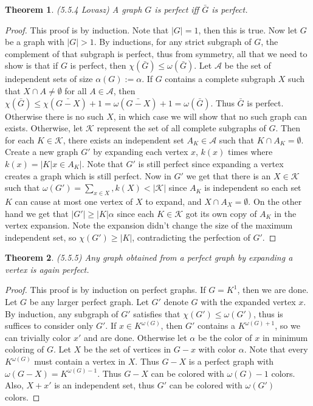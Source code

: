 \documentclass[12pt]{article}
\newtheorem{theorem}{Theorem}
\begin{document}
\begin{theorem} (5.5.4 Lovasz) A graph $G$ is perfect iff $\bar{G}$ is
  perfect.
\end{theorem}
\begin{proof} This proof is by induction. Note that $|G| = 1$, then
  this is true. Now let $G$ be a graph with $|G| > 1$. By inductions,
  for any strict subgraph of $G$, the complement of that subgraph is
  perfect, thus from symmetry, all that we need to show is that if $G$
  is perfect, then $\chi(\bar{G}) \leq \omega(\bar{G})$. Let
  $\mathcal{A}$ be the set of independent sets of size
  $\alpha(G) := \alpha$. If $G$ contains a complete subgraph $X$ such
  that $X \cap A \neq \emptyset$ for all $A \in \mathcal{A}$, then
  $\chi(\bar{G}) \leq \chi(\bar{G - X}) + 1 = \omega(\bar{G - X}) + 1
  = \omega(\bar{G})$. Thus $\bar{G}$ is perfect. Otherwise there is no
  such $X$, in which case we will show that no such graph can
  exists. Otherwise, let $\mathcal{K}$ represent the set of all
  complete subgraphs of $G$. Then for each $K \in \mathcal{K}$, there
  exists an independent set $A_K \in \mathcal{A}$ such that
  $K \cap A_K = \emptyset$. Create a new graph $G'$ by expanding each
  vertex $x$, $k(x)$ times where $k(x) = |{K | x \in A_K}|$. Note that
  $G'$ is still perfect since expanding a vertex creates a graph which
  is still perfect. Now in $G'$ we get that there is an
  $X \in \mathcal{K}$ such that
  $\omega(G') = \sum_{x \in X}, k(X) < |\mathcal{K}|$ since $A_K$ is
  independent so each set $K$ can cause at most one vertex of $X$ to
  expand, and $X \cap A_X = \emptyset$. On the other hand we get that
  $|G'| \geq |K| \alpha$ since each $K \in \mathcal{K}$ got its own
  copy of $A_K$ in the vertex expansion. Note the expansion didn't
  change the size of the maximum independent set, so
  $\chi(G') \geq |K|$, contradicting the perfection of $G'$.
\end{proof}

\begin{theorem} (5.5.5) Any graph obtained from a perfect graph by
  expanding a vertex is again perfect.
\end{theorem}
\begin{proof} This proof is by induction on perfect graphs. If
  $G = K^1$, then we are done. Let $G$ be any larger perfect
  graph. Let $G'$ denote $G$ with the expanded vertex $x$. By
  induction, any subgraph of $G'$ satisfies that
  $\chi(G') \leq \omega(G')$, thus is suffices to consider only
  $G'$. If $x \in K^{\omega(G)}$, then $G'$ contains a
  $K^{\omega(G) + 1}$, so we can trivially color $x'$ and are
  done. Otherwise let $\alpha$ be the color of $x$ in minimum coloring
  of $G$. Let $X$ be the set of vertices in $G-x$ with color
  $\alpha$. Note that every $K^{\omega(G)}$ must contain a vertex in
  $X$. Thus $G - X$ is a perfect graph with
  $\omega(G - X) = K^{\omega(G) - 1}$. Thus $G - X$ can be colored
  with $\omega(G) - 1$ colors. Also, $X + x'$ is an independent set,
  thus $G'$ can be colored with $\omega(G')$ colors.
\end{proof}
\end{document}
